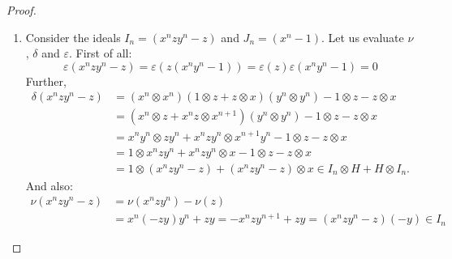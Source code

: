 \documentclass[8pt]{article}
\theoremstyle{definition}
\theoremstyle{definition}
\theoremstyle{definition}
\theoremstyle{definition}
\theoremstyle{definition}
\theoremstyle{definition}
\theoremstyle{definition}
\theoremstyle{definition}
\theoremstyle{definition}
\theoremstyle{definition}
\theoremstyle{definition}
\theoremstyle{definition}
\theoremstyle{definition}
\theoremstyle{definition}
\theoremstyle{question}
\begin{document}
\begin{proof}
\begin{enumerate}
    Let us show that $\nu^{2n}(z) = x^n z y^n$ and $\nu^{2n + 1}(z) = -x^n z y^{n + 1}$ for each $n < \omega$. The statement is trivial for $n = 0$.
    Let $n = k + 1$ and assume that $\nu^{2k}(z) = x^k z y^k$ and $\nu^{2k + 1}(z) = -x^k z y^{k + 1}$. We need 
    $\nu^{2k+2}(z) = x^{k+1} z y^{k+1}$ and $\nu^{2(k+1) + 1}(z) = -x^{k+1} z y^{k + 2}$.
    First of all, observe that:
    \[
    \nu^{2k+1}(z) = -x^k z y^{k+1} = -x^k z y y^{k} = x^k (-zy) y^k = \nu(y)^k \nu(z) \nu(x)^k
    \]
    Thus:
    \begin{align*}
      \nu^{2(k+1)}(z) &=  - \nu(y)^{n + 1}\nu(z) \nu(x)^n \\
      & -x^{n+1} (-zy)y^n = x^{n + 1} z y^{n+1}
    \end{align*}
    Similarly:
    \begin{align*}
    \nu^{2k + 3}(z) &= \nu^{2(k + 1)+1}(z) \\ 
    &= -x^{k + 1} z y^{k+2} = -x^{k+1} z y y^{k+2} \\ 
    &= x^{k+1} (-zy) y^{k+1} = \nu(y)^{k+1} \nu(z) \nu(x)^{k+1}
    \end{align*}
    Therefore:
    \begin{align*}
      \nu^{2(k+1) + 1}(z) &= \nu(y)^{k+1} \nu(z) \nu(x)^{k+1} \\
      &= \nu(x)^{k+1} (-zy) \nu(y)^{k+1} = - \nu(x)^{k+1} z \nu(y)^{k+2}
    \end{align*}
    \item Consider the ideals $I_n = (x^n z y^n - z)$ and $J_n = (x^n - 1)$. Let us evaluate $\nu$, $\delta$ and $\varepsilon$.
    First of all:
    \[
    \varepsilon(x^n z y^n - z) = \varepsilon(z (x^n y^n - 1)) = \varepsilon(z) \varepsilon(x^n y^n - 1) = 0
    \]
    Further,
    \begin{align*}
      \delta(x^n z y^n - z) &= (x^n \otimes x^n)(1 \otimes z + z \otimes x)(y^n \otimes y^n) - 1 \otimes z - z \otimes x \\
      &= (x^n \otimes z + x^n z \otimes x^{n + 1})(y^n \otimes y^n) - 1 \otimes z - z \otimes x \\
      &= x^n y^n \otimes z y^n + x^n z y^n \otimes x^{n + 1} y^n - 1 \otimes z - z \otimes x \\
      &= 1 \otimes x^n z y^n + x^n z y^n \otimes x - 1 \otimes z - z \otimes x \\
      &= 1 \otimes (x^n z y^n - z) + (x^n z y^n - z) \otimes x \in I_n \otimes H + H \otimes I_n.
    \end{align*}
    And also:
    \begin{align*}
      \nu (x^n z y^n - z) &= \nu(x^n z y^n) - \nu(z) \\
      &= x^n (-zy) y^n + zy = -x^n z y^{n+1} + zy = (x^n z y^n - z)(-y) \in I_n
    \end{align*}


\end{enumerate}
\end{proof}
\end{document}
